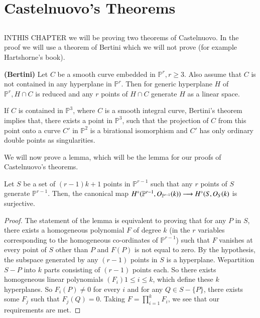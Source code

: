 
\chapter{Castelnuovo's Theorems}\label{chap3}

\section{}\label{chap3:sec1} IN\pageoriginale THIS CHAPTER we will be proving 
two theorems of Castelnuovo. In the proof we will use a theorem of Bertini
which we will not prove (\cf for example Hartshorne's book).

\begin{THM*}
{\bf (Bertini)} Let $C$ be a smooth curve embedded in
$\mathbb{P}^r,r\geq 3$. Also assume that $C$ is not contained in any
hyperplane in $\mathbb{P}^r$. Then for generic hyperplane $H$ of
$\mathbb{P}^r,H\cap C$ is reduced and any $r$ points of $H\cap C$
generate $H$ as a linear space.
\end{THM*}

\begin{REM*}
If $C$ is contained in $\mathbb{P}^3$, where $C$ is a smooth integral
curve, Bertini's theorem implies that, there exists a point in
$\mathbb{P}^3$, such that the projection of $C$ from this point onto a
curve $C'$ in $\mathbb{P}^2$ is a birational isomorphism and $C'$ has
only ordinary double points as singularities.
\end{REM*}

We will now prove a lemma, which will be the lemma for our proofs of
Castelnuovo's theorems. 
\begin{lem}\label{chap3:lem1}
Let $S$ be a set of $(r-1)k+1$ points in $\mathbb{P}^{r-1}$ such that
any $r$ points of $S$ generate $\mathbb{P}^{r-1}$. Then, the canonical
map $H^\circ(\mathbb{P}^{r-1},\break O_{\mathbb{P}^{r-1}}(k))\longrightarrow
H^\circ(S,O_S(k)$ is surjective.
\end{lem}

\begin{proof}
The statement of the lemma is equivalent to proving that for any $P$
in $S$, there exists a homogeneous polynomial $F$ of degree $k$ (in
the $r$ variables corresponding to the homogeneous co-ordinates of
$\mathbb{P}^{r-1}$) such that $F$ vanishes at every point of $S$ other
than $P$ and $F(P)$ is not equal to zero. By the hypothesis, the
subspace generated by any $(r-1)$ points in $S$ is a
hyperplane. We\pageoriginale partition $S-P$ into $k$ parts consisting
of $(r-1)$ points each. So there exists homogeneous linear polynomials
$(F_i)1\leq i\leq k$, which define these $k$ hyperplanes. So
$F_i(P)\neq 0$ for every $i$ and for any $Q\in S-\{P\}$, there exists
some $F_j$ such that $F_j(Q)=0$. Taking $F=\prod\limits_{i=1}^kF_i$, we
see that our requirements are met.
\end{proof}

